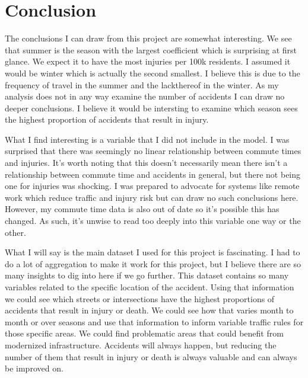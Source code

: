 \section*{Conclusion}

The conclusions I can draw from this project are somewhat interesting. We see that summer is the season with the largest coefficient which is surprising at first glance. We expect it to have the most injuries per 100k residents. I assumed it would be winter which is actually the second smallest. I believe this is due to the frequency of travel in the summer and the lackthereof in the winter. As my analysis does not in any way examine the number of accidents I can draw no deeper conclusions. I believe it would be intersting to examine which season sees the highest proportion of accidents that result in injury. 

What I find interesting is a variable that I did not include in the model. I was surprised that there was seemingly no linear relationship between commute times and injuries. It's worth noting that this doesn't necessarily mean there isn't a relationship between commute time and accidents in general, but there not being one for injuries was shocking. I was prepared to advocate for systems like remote work which reduce traffic and injury risk but can draw no such conclusions here. However, my commute time data is also out of date so it's possible this has changed. As such, it's unwise to read too deeply into this variable one way or the other. 

What I will say is the main dataset I used for this project is fascinating. I had to do a lot of aggregation to make it work for this project, but I believe there are so many insights to dig into here if we go further. This dataset contains so many variables related to the specific location of the accident. Using that information we could see which streets or intersections have the highest proportions of accidents that result in injury or death. We could see how that varies month to month or over seasons and use that information to inform variable traffic rules for those specific areas. We could find problematic areas that could benefit from modernized infrastructure. Accidents will always happen, but reducing the number of them that result in injury or death is always valuable and can always be improved on. 

